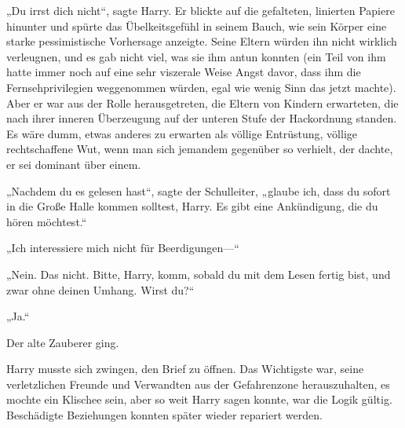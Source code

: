 „Du irrst dich nicht“, sagte Harry.
Er blickte auf die gefalteten, linierten Papiere hinunter und spürte das Übelkeitsgefühl in seinem Bauch, wie sein Körper eine starke pessimistische Vorhersage anzeigte. Seine Eltern würden ihn nicht wirklich verleugnen, und es gab nicht viel, was sie ihm antun konnten (ein Teil von ihm hatte immer noch auf eine sehr viszerale Weise Angst davor, dass ihm die Fernsehprivilegien weggenommen würden, egal wie wenig Sinn das jetzt machte). Aber er war aus der Rolle herausgetreten, die Eltern von Kindern erwarteten, die nach ihrer inneren Überzeugung auf der unteren Stufe der Hackordnung standen. Es wäre dumm, etwas anderes zu erwarten als völlige Entrüstung, völlige rechtschaffene Wut, wenn man sich jemandem gegenüber so verhielt, der dachte, er sei dominant über einem.

„Nachdem du es gelesen hast“, sagte der Schulleiter, „glaube ich, dass du sofort in die Große Halle kommen solltest, Harry. Es gibt eine Ankündigung, die du hören möchtest.“

„Ich interessiere mich nicht für Beerdigungen—“

„Nein. Das nicht. Bitte, Harry, komm, sobald du mit dem Lesen fertig bist, und zwar ohne deinen Umhang. Wirst du?“

„Ja.“

Der alte Zauberer ging.

Harry musste sich zwingen, den Brief zu öffnen. Das Wichtigste war, seine verletzlichen Freunde und Verwandten aus der Gefahrenzone herauszuhalten, es mochte ein Klischee sein, aber so weit Harry sagen konnte, war die Logik gültig. Beschädigte Beziehungen konnten später wieder repariert werden.

